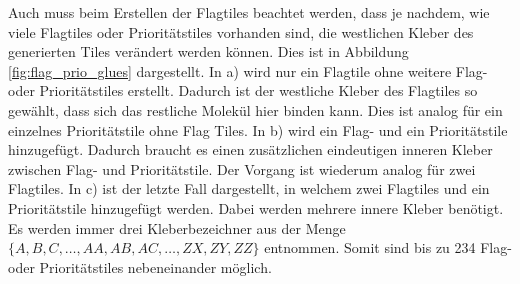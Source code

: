 Auch muss beim Erstellen der Flagtiles beachtet werden, dass je nachdem, wie viele Flagtiles oder Prioritätstiles vorhanden sind, die westlichen Kleber des generierten Tiles verändert werden können. Dies ist in Abbildung \ref{fig:flag_prio_glues} dargestellt. In a) wird nur ein Flagtile ohne weitere Flag- oder Prioritätstiles erstellt. Dadurch ist der westliche Kleber des Flagtiles so gewählt, dass sich das restliche Molekül hier binden kann.
Dies ist analog für ein einzelnes Prioritätstile ohne Flag Tiles. In b) wird ein Flag- und ein Prioritätstile hinzugefügt. Dadurch braucht es einen zusätzlichen eindeutigen inneren Kleber zwischen Flag- und Prioritätstile. Der Vorgang ist wiederum analog für zwei Flagtiles. In c) ist der letzte Fall dargestellt, in welchem zwei Flagtiles und ein Prioritätstile hinzugefügt werden. Dabei werden mehrere innere Kleber benötigt. Es werden immer drei Kleberbezeichner aus der Menge $\{A,B,C,\dots,AA,AB,AC,\dots,ZX,ZY,ZZ\}$ entnommen. Somit sind bis zu 234 Flag- oder Prioritätstiles nebeneinander möglich.


